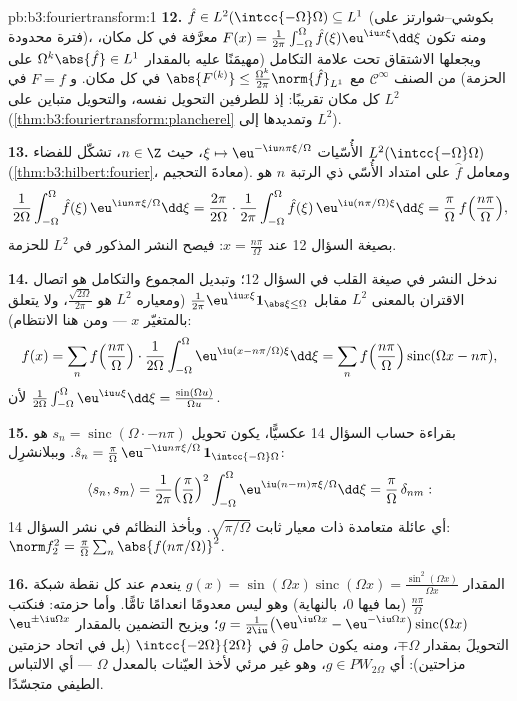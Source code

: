 \begin{solution}{pb:b3:fouriertransform:1}
\textbf{12.} $\hat f \in L^2(\intcc{-\Omega}\Omega)
\subseteq L^1$ (بكوشي--شوارتز على فترة محدودة)، ومنه تكون
$F(x) = \frac1{2\pi}\int_{-\Omega}^\Omega\hat
f(\xi)\eu^{\iu x\xi}\dd\xi$ معرَّفة في كل مكان، ويجعلها الاشتقاق تحت علامة التكامل
(مهيمَنًا عليه بالمقدار $\Omega^k\abs{\hat f} \in L^1$ على الحزمة) من الصنف $\mathcal C^\infty$
مع $\abs{F^{(k)}} \leq
\frac{\Omega^k}{2\pi}\norm{\hat f}_{L^1}$ في كل مكان. و $F
= f$ في كل مكان تقريبًا: إذ للطرفين
التحويل نفسه، والتحويل متباين على $L^2$ (\cref{thm:b3:fouriertransform:plancherel} وتمديدها
إلى $L^2$).

\textbf{13.} الأُسّيات $\xi \mapsto \eu^{-\iu
n\pi\xi/\Omega}$، حيث $n \in \Z$، تشكّل  للفضاء $L^2(\intcc{-\Omega}\Omega)$ (\cref{thm:b3:hilbert:fourier}، معادةَ التحجيم). ومعامل
$\hat f$ على امتداد الأُسّي ذي الرتبة $n$ هو
\[
\frac1{2\Omega}\int_{-\Omega}^\Omega\hat f(\xi)\,
\eu^{\iu n\pi\xi/\Omega}\dd\xi
= \frac{2\pi}{2\Omega}\cdot
\frac1{2\pi}\int_{-\Omega}^{\Omega}\hat f(\xi)\,
\eu^{\iu(n\pi/\Omega)\xi}\dd\xi
= \frac\pi\Omega\,f\Bigl(\frac{n\pi}\Omega\Bigr),
\]
بصيغة السؤال 12 عند $x = \frac{n\pi}\Omega$: فيصح النشر المذكور في $L^2$ للحزمة.

\textbf{14.} ندخل النشر في صيغة القلب في السؤال 12؛ وتبديل
المجموع والتكامل هو اتصال الاقتران بالمعنى $L^2$ مقابل $\frac1{2\pi}
\eu^{\iu x\xi}\mathbf 1_{\abs\xi\leq\Omega}$
(ومعياره $L^2$ هو $\frac{\sqrt{2\Omega}}{2\pi}$، ولا يتعلق بالمتغيّر $x$ --- ومن هنا
الانتظام):
\[
f(x) = \sum_nf\Bigl(\frac{n\pi}\Omega\Bigr)\cdot
\frac1{2\Omega}\int_{-\Omega}^\Omega
\eu^{\iu(x - n\pi/\Omega)\xi}\dd\xi
= \sum_nf\Bigl(\frac{n\pi}\Omega\Bigr)
\operatorname{sinc}(\Omega x - n\pi),
\]
لأن $\frac1{2\Omega}\int_{-\Omega}^\Omega\eu^{\iu
u\xi}\dd\xi = \frac{\sin(\Omega u)}{\Omega u}$.

\textbf{15.} بقراءة حساب السؤال 14 عكسيًّا، يكون تحويل $s_n = \operatorname{sinc}(\Omega\cdot -
n\pi)$
هو $\hat s_n = \frac\pi\Omega\,\eu^{-\iu
n\pi\xi/\Omega}\,\mathbf 1_{\intcc{-\Omega}\Omega}$. وببلانشرِل:
\[
\langle s_n, s_m\rangle = \frac1{2\pi}
\Bigl(\frac\pi\Omega\Bigr)^2\int_{-\Omega}^\Omega
\eu^{\iu(n-m)\pi\xi/\Omega}\dd\xi =
\frac\pi\Omega\,\delta_{nm} :
\]
أي عائلة متعامدة ذات معيار ثابت $\sqrt{\pi/\Omega}$. وبأخذ النظائم في نشر
السؤال 14: $\norm f_2^2 =
\frac\pi\Omega\sum_n\abs{f(n\pi/\Omega)}^2$.

\textbf{16.} المقدار $g(x) = \sin(\Omega x)\operatorname{sinc}
(\Omega x) = \frac{\sin^2(\Omega x)}{\Omega x}$ ينعدم عند كل نقطة شبكة $\frac{n\pi}\Omega$
(بما فيها $0$، بالنهاية) وهو ليس معدومًا انعدامًا تامًّا. وأما
حزمته: فنكتب $g =
\frac1{2\iu}\bigl(\eu^{\iu\Omega x} - \eu^{-\iu\Omega
x}\bigr)\operatorname{sinc}(\Omega x)$؛ ويزيح التضمين بالمقدار $\eu^{\pm\iu\Omega x}$ التحويلَ
بمقدار $\mp\Omega$، ومنه يكون حامل $\hat g$ في $\intcc{-2\Omega}{2\Omega}$ (بل في
اتحاد حزمتين مزاحتين): أي $g \in PW_{2\Omega}$، وهو غير مرئي لأخذ العيّنات
بالمعدل $\Omega$ --- أي الالتباس الطيفي متجسّدًا.


\end{solution}
